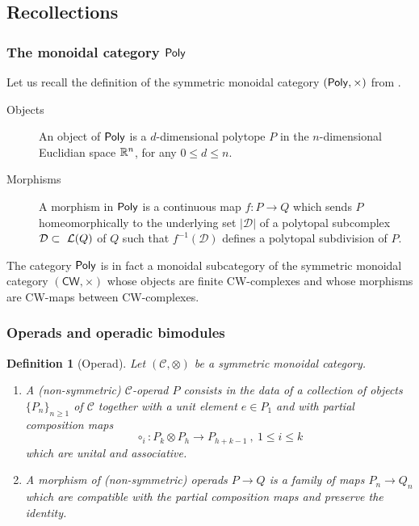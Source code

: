\documentclass[twoside, 12pt]{amsart}
\newtheorem{definition}{Definition}[section]
\theoremstyle{remark}
\begin{document}
 
\subsection{Recollections}

\subsubsection{The monoidal category $\mathsf{Poly}$}

Let us recall the definition of the symmetric monoidal category $(\mathsf{Poly}, \times)$ from \cite[Section~2.1]{MTTV19}.
\begin{description}
\item[{\sc Objects}] An object of $\mathsf{Poly}$ is a $d$-dimensional  polytope $P$ in the $n$-dimensional Euclidian space $\mathbb{R}^n$, for any $0\leq d\leq n$.
\item[{\sc Morphisms}] A morphism in $\mathsf{Poly}$ is a continuous map  $f: P\to Q$ which sends  $P$ homeomorphically to the underlying set $|\mathcal{D}|$ of a polytopal subcomplex $\mathcal{D}\subset~\mathcal{L}(Q)$ of $Q$ 
such that $f^{-1}(\mathcal D)$ defines a polytopal subdivision of $P$.
\end{description}
The category $\mathsf{Poly}$ is in fact a monoidal subcategory of the symmetric monoidal category $(\mathsf{CW},\times )$ whose objects are finite CW-complexes and whose morphisms are CW-maps between CW-complexes.

\subsubsection{Operads and operadic bimodules} 

\begin{definition}[Operad] Let $(\mathcal{C},\otimes )$ be a symmetric monoidal category.
\begin{enumerate}[leftmargin=*]
\item A \emph{(non-symmetric) $\mathcal{C}$-operad} $P$ consists in the data of a collection of objects $\{ P_n \}_{n \geqslant 1}$ of $\mathcal{C}$ together with a unit element $e \in P_1$ and with partial composition maps
\[ \circ_i : P_k \otimes P_h \longrightarrow P_{h+k-1} \ , \ 1 \leqslant i \leqslant k  \]
which are unital and associative.
\item A \emph{morphism of (non-symmetric) operads} $P \rightarrow Q$ is a family of maps $P_n \rightarrow Q_n$ which are compatible with the partial composition maps and preserve the identity.
\end{enumerate}
\end{definition}
\end{document}
